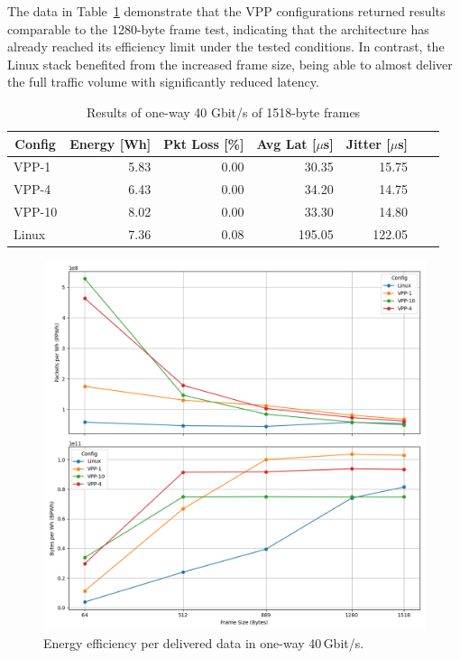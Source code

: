 The data in Table~\ref{tab:40udp:1518B} demonstrate that the VPP configurations returned results comparable to the 1280-byte frame test,
indicating that the architecture has already reached its efficiency limit under the tested conditions.
In contrast, the Linux stack benefited from the increased frame size, being able to almost deliver the full traffic volume with significantly reduced latency.

\begin{table}[h!]
\centering
\caption{Results of one-way 40 Gbit/s of 1518-byte frames}
\begin{tabular}{|l|r|r|r|r|r|r|}
\hline
\multicolumn{1}{|c|}{\textbf{Config}} &
\multicolumn{1}{c|}{\textbf{Energy [Wh] }} &
\multicolumn{1}{c|}{\textbf{Pkt Loss [\%]}} &
\multicolumn{1}{c|}{\textbf{Avg Lat [$\mu$s]}} &
\multicolumn{1}{c|}{\textbf{Jitter [$\mu$s]}} \\
\hline 
VPP-1 & 5.83 & 0.00 & 30.35 & 15.75 \\
VPP-4 & 6.43 & 0.00 & 34.20 & 14.75 \\
VPP-10 & 8.02 & 0.00 & 33.30 & 14.80 \\
Linux & 7.36 & 0.08 & 195.05 & 122.05 \\
\hline
\end{tabular}
\label{tab:40udp:1518B}
\end{table}

\begin{figure}[!htbp]
    \centering
    \includegraphics[width=\linewidth]{images/consumption-40g.png}
    \caption{Energy efficiency per delivered data in one-way 40\,Gbit/s.}
    \label{fig:40g}
\end{figure}









